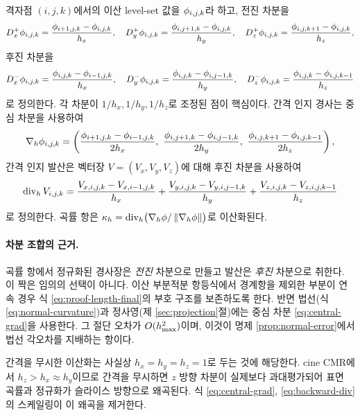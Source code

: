 격자점 $(i,j,k)$에서의 이산 level-set 값을 $\phi_{i,j,k}$라 하고, 전진 차분을
\begin{equation}
  D^+_x \phi_{i,j,k} = \frac{\phi_{i+1,j,k}-\phi_{i,j,k}}{h_x},\quad
  D^+_y \phi_{i,j,k} = \frac{\phi_{i,j+1,k}-\phi_{i,j,k}}{h_y},\quad
  D^+_z \phi_{i,j,k} = \frac{\phi_{i,j,k+1}-\phi_{i,j,k}}{h_z},
  \label{eq:forward-diff}
\end{equation}
후진 차분을
\begin{equation}
  D^-_x \phi_{i,j,k} = \frac{\phi_{i,j,k}-\phi_{i-1,j,k}}{h_x},\quad
  D^-_y \phi_{i,j,k} = \frac{\phi_{i,j,k}-\phi_{i,j-1,k}}{h_y},\quad
  D^-_z \phi_{i,j,k} = \frac{\phi_{i,j,k}-\phi_{i,j,k-1}}{h_z}
  \label{eq:backward-diff}
\end{equation}
로 정의한다. 각 차분이 $1/h_x, 1/h_y, 1/h_z$로 조정된 점이 핵심이다. 간격 인지
경사는 중심 차분을 사용하여
\begin{equation}
  \nabla_h\phi_{i,j,k} =
  \left(
    \frac{\phi_{i+1,j,k}-\phi_{i-1,j,k}}{2h_x},\
    \frac{\phi_{i,j+1,k}-\phi_{i,j-1,k}}{2h_y},\
    \frac{\phi_{i,j,k+1}-\phi_{i,j,k-1}}{2h_z}
  \right),
  \label{eq:central-grad}
\end{equation}
간격 인지 발산은 벡터장 $V=(V_x,V_y,V_z)$에 대해 후진 차분을 사용하여
\begin{equation}
  \operatorname{div}_h V_{i,j,k} =
  \frac{V_{x,i,j,k}-V_{x,i-1,j,k}}{h_x}
  + \frac{V_{y,i,j,k}-V_{y,i,j-1,k}}{h_y}
  + \frac{V_{z,i,j,k}-V_{z,i,j,k-1}}{h_z}
  \label{eq:backward-div}
\end{equation}
로 정의한다. 곡률 항은 $\kappa_h = \operatorname{div}_h\bigl(\nabla_h\phi/\left\lVert \nabla_h\phi \right\rVert\bigr)$로
이산화된다.

\paragraph{차분 조합의 근거.}
곡률 항에서 정규화된 경사장은 \emph{전진} 차분으로 만들고 발산은 \emph{후진} 차분으로
취한다. 이 짝은 임의의 선택이 아니다. 이산 부분적분 항등식에서 경계항을 제외한
부분이 연속 경우 식 \eqref{eq:proof-length-final}의 부호 구조를 보존하도록 한다.
반면 법선(식 \eqref{eq:normal-curvature})과 정사영(제 \ref{sec:projection}절)에는
중심 차분 \eqref{eq:central-grad}을 사용한다. 그 절단 오차가 $O(h_{\max}^2)$이며, 이것이
명제 \ref{prop:normal-error}에서 법선 각오차를 지배하는 항이다.

\begin{remark}[비등방성의 반영]
간격을 무시한 이산화는 사실상 $h_x=h_y=h_z=1$로 두는 것에 해당한다. cine CMR에서
$h_z > h_x \approx h_y$이므로 간격을 무시하면 $z$ 방향 차분이 실제보다 과대평가되어
표면 곡률과 정규화가 슬라이스 방향으로 왜곡된다. 식 \eqref{eq:central-grad},
\eqref{eq:backward-div}의 스케일링이 이 왜곡을 제거한다.
\end{remark}

